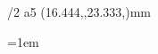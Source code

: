 \fontfam[arno]
\fontfam[unifrakturmaguntia]
\typosize[12/16]

\hsize=100mm
\vsize=148mm
\margins/2 a5 (16.444,,23.333,)mm

\parskip0pt
\parindent=1em

\everymnote{\it}
\mnoteindent=4mm
\mnotesize=20mm

\def\Vermillion{\setcmykcolor{0 71 77 11}}


\def\title#1{%
    \centerline{%
		\Arno
    	\typosize[15/]%
    	#1%
    }%
    \vskip4\baselineskip
    \_firstnoindent
}

